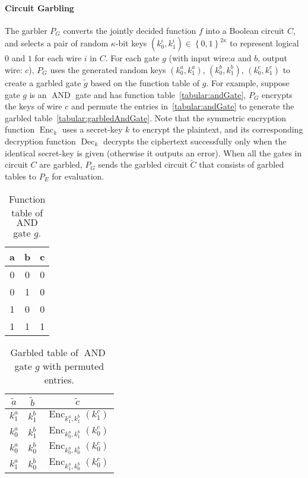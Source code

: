 \paragraph{Circuit Garbling}
The garbler $P_G$ converts the jointly decided function $f$ into a Boolean circuit $C$, and selects a pair of random $\kappa$-bit keys $\left(k_0^i,k_1^i\right)\in \left\{0,1\right\}^{2\kappa}$ to represent logical $0$ and $1$ for each wire $i$ in $C$. For each gate $g$ (with input wire:$a$ and $b$, output wire: $c$), $P_G$ uses the generated random keys $\left(k_0^a,k_1^a\right)$, $\left(k_0^b,k_1^b\right)$, $\left(k_0^c,k_1^c\right)$ to create a garbled gate $\tilde{g}$ based on the function table of $g$. For example, suppose gate $g$ is an $\operatorname{AND}$ gate and has function table~\autoref{tabular:andGate}, $P_G$ encrypts the keys of wire $c$ and permute the entries in~\autoref{tabular:andGate} to generate the garbled table~\autoref{tabular:garbledAndGate}. Note that the symmetric encryption function $\operatorname{Enc}_k$ uses a secret-key $k$ to encrypt the plaintext, and its corresponding decryption function $\operatorname{Dec}_k$ decrypts the ciphertext successfully only when the identical secret-key is given (otherwise it outputs an error). When all the gates in circuit $C$ are garbled, $P_G$ sends the garbled circuit $\widetilde{C}$ that consists of garbled tables to $P_E$ for evaluation.

\begin{table}[htbp]
    \centering
    \begin{tabular}{|c|c||c|}

        a            & b & c \\
        \hline     0 & 0 & 0 \\
        0            & 1 & 0 \\
        1            & 0 & 0 \\
        1            & 1 & 1 \\
    \end{tabular}
    \caption{Function table of $\operatorname{AND}$ gate $g$.}
    \label{tabular:andGate}
\end{table}

\begin{table}[htbp]
    \centering
    \begin{tabular}{|c|c||c|}
        $\tilde{a}$ & $\tilde{b}$ & $\tilde{c}$                                           \\
        \hline
        $k_1^a$     & $k_1^b$     & $\operatorname{Enc}_{k_1^a, k_1^b}\left(k_1^c\right)$ \\
        $k_0^a$     & $k_1^b$     & $\operatorname{Enc}_{k_0^a, k_1^b}\left(k_0^c\right)$ \\
        $k_0^a$     & $k_0^b$     & $\operatorname{Enc}_{k_0^a, k_0^b}\left(k_0^c\right)$ \\
        $k_1^a$     & $k_0^b$     & $\operatorname{Enc}_{k_1^a, k_0^b}\left(k_0^c\right)$ \\
    \end{tabular}
    \caption{Garbled table of $\operatorname{AND}$ gate $g$ with permuted entries.}
    \label{tabular:garbledAndGate}
\end{table}

